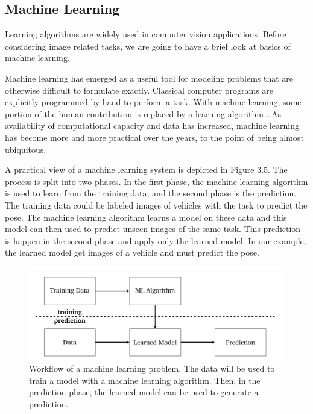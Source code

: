 \subsection{Machine Learning}
Learning algorithms are widely used in computer vision applications. Before considering image related tasks, we are going to have a brief look at basics of machine learning.

Machine learning has emerged as a useful tool for modeling problems that are otherwise difficult to formulate exactly. Classical computer programs are explicitly programmed by hand to perform a task. With machine learning, some portion of the human contribution is replaced by a learning algorithm \cite{goodfellow2016deep}. As availability of computational capacity and data has increased, machine learning has become more and more practical over the years, to the point of being almost ubiquitous.

A practical view of a machine learning system is depicted in Figure 3.5. The process is split into two phases. In the first phase, the machine learning algorithm is used to learn from the training data, and the second phase is the prediction. The training data could be labeled images of vehicles with the task to predict the pose. The machine learning algorithm learns a model on these data and this model can then used to predict unseen images of the same task. This prediction is happen in the second phase and apply only the learned model. In our example, the learned model get images of a vehicle and must predict the pose.
\begin{figure}[h]
	\centering
	\includegraphics[width=\textwidth]{Figures/Section3_ML}
	\caption{Workflow of a machine learning problem. The data will be used to train a model with a machine learning algorithm. Then, in the prediction phase, the learned model can be used to generate a prediction.}
	\label{fig: machine learning}
\end{figure}

